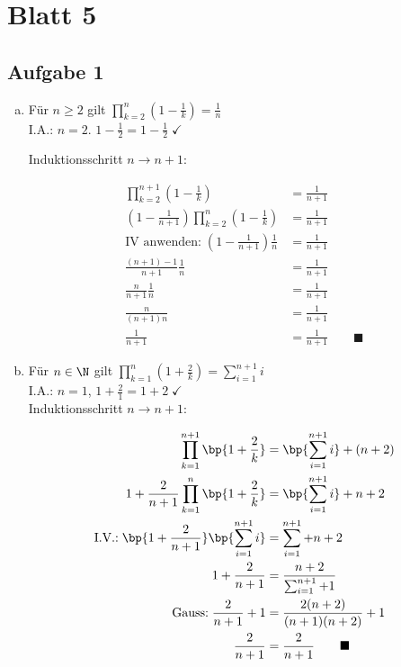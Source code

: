 \section*{Blatt 5}

\subsection*{Aufgabe 1}

\begin{enumerate}[a)]

\item Für $n\geq 2$ gilt $\prod_{k=2}^n (1 - \frac{1}{k}) = \frac{1}{n}$ \\

I.A.: $n=2$. $1 - \frac{1}{2} = 1 - \frac{1}{2} \; \checkmark$

Induktionsschritt $n \to n+1$:

\begin{align*}
\prod_{k=2}^{n+1} (1 - \frac{1}{k}) &= \frac{1}{n+1} \\
(1 - \frac{1}{n+1}) \prod_{k=2}^{n} (1 - \frac{1}{k}) &= \frac{1}{n+1} \\
\text{IV anwenden:} \; (1- \frac{1}{n+1})\frac{1}{n} &= \frac{1}{n+1} \\
\frac{(n+1)-1}{n+1} \frac{1}{n} &= \frac{1}{n+1}\\
\frac{n}{n+1} \frac{1}{n} &= \frac{1}{n+1}\\
\frac{n}{(n+1)n} &= \frac{1}{n+1}\\
\frac{1}{n+1} &= \frac{1}{n+1} \hspace{2em} \blacksquare
\end{align*}

\item Für $n\in\N$ gilt $\prod_{k=1}^{n} (1 + \frac{2}{k}) = \sum_{i=1}^{n+1} i$\\

I.A.: $n=1$, $ 1 + \frac{2}{1} = 1+2 \; \checkmark$ \\

Induktionsschritt $n \to n+1$:

\begin{align*}
\prod_{k=1}^{n+1} \bp{1 + \frac{2}{k}} &= \bp{\sum_{i=1}^{n+1} i} + (n+2) \\
1 + \frac{2}{n+1} \prod_{k=1}^{n} \bp{1 + \frac{2}{k}} &= \bp{\sum_{i=1}^{n+1} i} + n + 2 \\
\text{I.V.:} \; \bp{ 1 + \frac{2}{n+1} } \bp{ \sum_{i=1}^{n+1} i } &= \sum_{i=1}^{n+1} + n + 2\\
1 + \frac{2}{n+1} &= \frac{n+2}{ \sum_{i=1}^{n+1} +1}\\
\text{Gauss:} \; \frac{2}{n+1} + 1 &= \frac{2(n+2)}{(n+1)(n+2)}+1\\
\frac{2}{n+1} &= \frac{2}{n+1} \hspace{2em} \blacksquare
\end{align*}



\end{enumerate}

